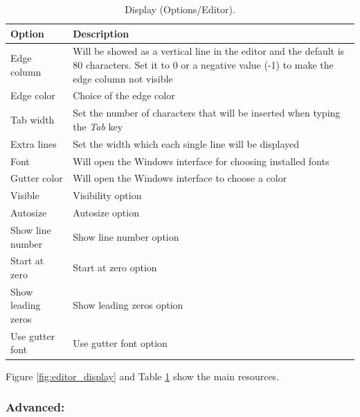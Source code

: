 \begin{table}
  \begin{footnotesize}
    \begin{tabularx}{\textwidth}{>{\hsize=0.3\hsize}X>{\hsize=0.7\hsize}X}\\
      \hline
      \textbf{Option} & \textbf{Description} \\
      \hline  %
      Edge column & Will be showed as a vertical line in the editor and the default is 80 characters.
      Set it to 0 or a negative value (-1) to make the edge column not visible \\
      Edge color & Choice of the edge color \\
      Tab width & Set the number of characters that will be inserted when typing the \textit{Tab} key \\
      Extra lines & Set the width which each single line will be displayed \\
      Font & Will open the Windows interface for choosing installed fonts \\
      \hline %
      Gutter color & Will open the Windows interface to choose a color \\
      Visible & Visibility option \\
      Autosize & Autosize option \\
      Show line number & Show line number option \\
      Start at zero & Start at zero option \\
      Show leading zeros & Show leading zeros option \\
      Use gutter font & Use gutter font option \\
      \hline
    \end{tabularx}
  \end{footnotesize}
  \caption{Display (Options/Editor).}
  \label{tab:editor_display}
\end{table}

Figure \ref{fig:editor_display} and
Table \ref{tab:editor_display}
show the main resources.

\hypertarget{working_editor_advanced}{}
\subsubsection{Advanced:}

